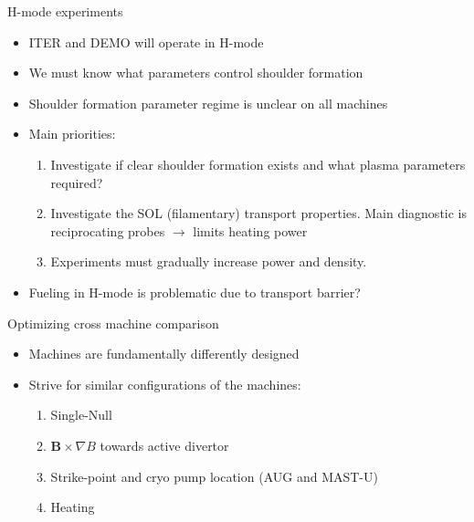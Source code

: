 \documentclass[10pt, compress]{beamer}
\begin{document}
\begin{frame}{H-mode experiments}
\begin{itemize}
	\item ITER and DEMO will operate in H-mode
	\item We must know what parameters control shoulder formation 
	\item Shoulder formation parameter regime is unclear on all machines
	\item Main priorities: 
	\begin{enumerate}
		\item Investigate if clear shoulder formation exists and what plasma parameters required? 
		\item Investigate the SOL (filamentary) transport properties. Main diagnostic is reciprocating probes $\rightarrow$ limits heating power
		\item Experiments must gradually increase power and density. 
	\end{enumerate}
	\item Fueling in H-mode is problematic due to transport barrier? 
\end{itemize}

\end{frame}


\begin{frame}{Optimizing cross machine comparison}
\begin{itemize}
	\item Machines are fundamentally differently designed
	\item Strive for similar configurations of the machines:
	\begin{enumerate} 
		\item Single-Null
		\item $\bm{B} \times \nabla B$ towards active divertor 
		\item Strike-point and cryo pump location (AUG and MAST-U)
		\item Heating 
	\end{enumerate}
\end{itemize} 


\end{frame}
\end{document}
